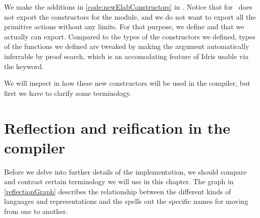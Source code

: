 We make the additions in \autoref{code:newElabConstructors} in \LRE.  Notice
that  for \Elab\ does not export the constructors for the module,
and we do not want to export all the primitive actions without any limits. For
that purpose, we define  and  that
we actually can export. Compared to the types of the constructors we defined,
types of the functions we defined are tweaked by making the 
argument automatically inferrable by proof search, which is
an accomodating feature of Idris usable via the  keyword.

We will inspect in \label{sec:primitiveEditorableImpl} how these new
constructors will be used in the compiler, but first we have to clarify some
terminology.

\newpage
\section{Reflection and reification in the compiler}

Before we delve into further details of the implementation, we should compare
and contrast certain terminology we will use in this chapter. The graph in
\autoref{reflectionGraph} describes the relationship between the different
kinds of languages and representations and the spells out the specific names
for moving from one to another.

